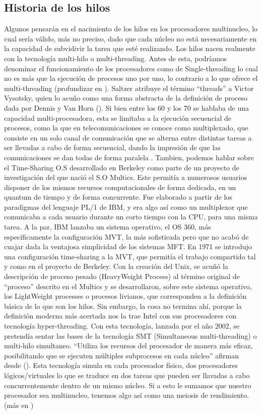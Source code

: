 \documentclass[12pt]{article}
\begin{document}
\begin{multicols}{2}
\section*{Historia de los hilos}
Algunos pensarán en el nacimiento de los hilos en los procesadores multinucleo, lo cual sería válido, más no preciso, dado que cada núcleo no está necesariamente en la capacidad de subvidivir la tarea que esté realizando. Los hilos nacen realmente con la tecnología multi-hilo o multi-threading. Antes de esta, podríamos denominar el funcionamiento de los procesadores como de Single-threading lo cual no es más que la ejecución de procesos uno por uno, lo contrario a lo que ofrece el multi-threading (profundizar en \cite{Sil}). Saltzer atribuye el término “threads” a Victor Vysotsky, quien lo acuño como una forma abstracta de la definición de proceso dada por Dennis y Van Horn (\cite{Sal}). Si bien entre los 60 y los 70 se hablaba de una capacidad multi-procesadora, esta se limitaba a la ejecución secuencial de procesos, como la que en telecomunicaciones se conoce como multiplexado, que consiste en un solo canal de comunicación que se alterna entre distintas tareas a ser llevadas a cabo de forma secuencial, dando la impresión de que las comunicaciones se dan todas de forma paralela \cite{Kri}. Tambien, podemos hablar sobre el Time-Sharing O.S desarrollado en Berkeley como parte de un proyecto de investigación del que nació el S.O Multics\cite{Unk}. Este permitía a numerosos usuarios disponer de los mismos recursos computacionales de forma dedicada, en un quantum de tiempo y de forma concurrente. Fue elaborado a partir de los paradigmas del lenguaje PL/1 de IBM, y era algo así como un multiplexor que comunicaba a cada usuario durante un corto tiempo con la CPU, para una misma tarea. A la par, IBM lanzaba un sistema operativo, el OS 360, más específicamente la configuración MVT, la más sofisticada pero que no acabó de cuajar dada la ventajosa simplicidad de los sistemas MFT. En 1971 se introdujo una configuración time-sharing a la MVT, que permitía el trabajo compartido tal y como en el proyecto de Berkeley\cite{Ibm}. Con la creación del Unix, se acuñó la descripción de proceso pesado (HeavyWeight Process) al término original de “proceso” descrito en el Multics y se desarrollaron, sobre este sistema operativo, los LightWeight processes o procesos livianos, que corresponden a la definición básica de lo que son los hilos. Sin embargo, la cosa no termina ahí, porque la definición moderna más acertada nos la trae Intel con sus procesadores con tecnología hyper-threading. Con esta tecnología, lanzada por el año 2002, se pretendía sentar las bases de la tecnología SMT (Simultaneous multi-threading) o multi-hilo simultaneo. “Utiliza los recursos del procesador de manera más eficaz, posibilitando que se ejecuten múltiples subprocesos en cada núcleo” afirman desde (\cite{Int}). Esta tecnología simula en cada procesador físico, dos procesadores lógicos/virtuales lo que se traduce en dos tareas que pueden ser llavadas a cabo concurrentemente dentro de un mismo núcleo. Si a esto le sumamos que nuestro procesador sea multinucleo, tenemos algo así como una meiosis de rendimiento. (más en \cite{Cro})


\end{multicols}
\end{document}
